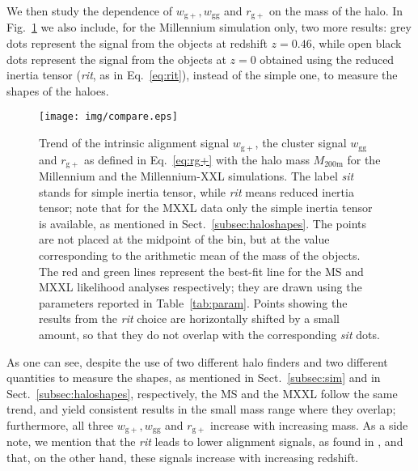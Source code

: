 \documentclass[a4paper,11pt]{article}
\begin{document}
We then study the dependence of $w_{\mathrm{g+}}, w_{\mathrm{gg}}$ and $r_{\mathrm{g+}}$ on the mass of the halo. In Fig.~\ref{fig:vsmass} we also include, for the Millennium simulation only, two more results: grey dots represent the signal from the objects at redshift $z = 0.46$, while open black dots represent the signal from the objects at $z = 0$ obtained using the reduced inertia tensor (\textit{rit}, as in Eq.~\ref{eq:rit}), instead of the simple one, to measure the shapes of the haloes.
\begin{figure}
	\centerline{
	\texttt{[image: img/compare.eps]}}
	\caption{Trend of the intrinsic alignment signal $w_{\mathrm{g+}}$, the cluster signal $w_{\mathrm{gg}}$ and $r_{\mathrm{g+}}$ as defined in Eq.~\ref{eq:rg+} with the halo mass $M_{\mathrm{200m}}$ for the Millennium and the Millennium-XXL simulations. The label \textit{sit} stands for simple inertia tensor, while \textit{rit} means reduced inertia tensor; note that for the MXXL data only the simple inertia tensor is available, as mentioned in Sect.~\ref{subsec:haloshapes}. The points are not placed at the midpoint of the bin, but at the value corresponding to the arithmetic mean of the mass of the objects. The red and green lines represent the best-fit line for the MS and MXXL likelihood analyses respectively; they are drawn using the parameters reported in Table~\ref{tab:param}. Points showing the results from the \textit{rit} choice are horizontally shifted by a small amount, so that they do not overlap with the corresponding \textit{sit} dots.}
	\label{fig:vsmass}
\end{figure}
As one can see, despite the use of two different halo finders and two different quantities to measure the shapes, as mentioned in Sect.~\ref{subsec:sim} and in Sect.~\ref{subsec:haloshapes}, respectively, the MS and the MXXL follow the same trend, and yield consistent results in the small mass range where they overlap; furthermore, all three $w_{\mathrm{g+}}, w_{\mathrm{gg}}$ and $r_{\mathrm{g+}}$ increase with increasing mass. As a side note, we mention that the \textit{rit} leads to lower alignment signals, as found in \cite{Joachimietal2013b}, and that, on the other hand, these signals increase with increasing redshift. 
\end{document}
